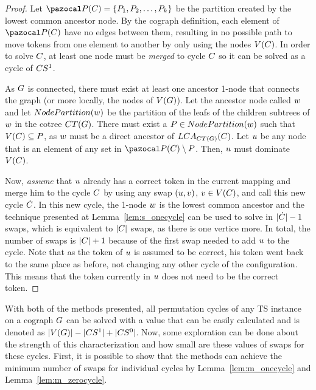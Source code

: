 \documentclass[msc,english,table,xcdraw]{ppgccufmg}
\begin{document}
\begin{proof}
Let $\partitionFunc{\cycle} = \createSet{\partitionElem_{1}, \partitionElem_{2}, 
\ldots, \partitionElem_{k}}$ be the partition created by the lowest common
ancestor node.
By the cograph definition, each element of $\partitionFunc{\cycle}$ have no
edges between them, resulting in no possible path to move tokens from one 
element to another by only using the nodes $V(C)$.
In order to solve $C$, at least one node must be \textit{merged} to cycle 
$C$ so it can be solved as a cycle of $CS^{1}$.

As $G$ is connected, there must exist at least one ancestor 1-node that 
connects the graph (or more locally, the nodes of $V(G)$).
Let the ancestor node called $w$ and let
$NodePartition(w)$ be the partition of the leafs of the children 
subtrees of $w$ in the cotree $CT(G)$.
There must exist a $P \in NodePartition(w)$ such that 
$V(C) \subseteq P$, as $w$ must be 
a direct ancestor of $LCA_{CT(G)}(C)$.
Let $u$ be any node that is an element of any set in $\partitionFunc{\cycle} 
\setminus \partitionElem$.
Then, $u$ must dominate $V(C)$.

Now, \textit{assume} that $u$ already has a correct token in the current 
mapping and merge him to the cycle $C$ by using any swap $(u,
v)$, $v \in V(C)$, and call this new cycle $\dot{C}$.
In this new cycle, the 1-node $w$ is the lowest common ancestor and the
technique presented at Lemma~\ref{lem:s_onecycle} can be used to solve in 
$|\dot{C}| - 1$ swaps, which is equivalent to $|C|$
swaps, as there is one vertice more. 
In total, the number of swaps is $|C| + 1$ because of the first swap 
needed to add $u$ to the cycle.
Note that as the token of $u$ is assumed to be correct, his token went
back to the same place as before, not changing any other cycle of the
configuration.
This means that the token currently in $u$ does not need to be the correct
token.
\end{proof}

With both of the methods presented, all permutation cycles of any TS instance
on a cograph $G$ can be solved with a value that can be easily calculated 
and is denoted as $|V(G)| - |CS^{1}| + 
|CS^{0}|$.
Now, some exploration can be done about the strength of this characterization
and how small are these values of swaps for these cycles.
First, it is possible to show that the methods can achieve the minimum
number of swaps for individual cycles by Lemma~\ref{lem:m_onecycle} and
Lemma~\ref{lem:m_zerocycle}.
\end{document}
